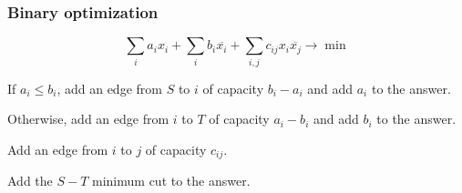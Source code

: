 \subsubsection{Binary optimization}
\[\sum_i a_i x_i + \sum_i b_i \overline{x_i} + \sum_{i, j} c_{i j} x_i \overline{x_j} \to \min\]

If $a_i \le b_i$,
add an edge from $S$ to $i$ of capacity $b_i - a_i$
and add $a_i$ to the answer.

Otherwise,
add an edge from $i$ to $T$ of capacity $a_i - b_i$
and add $b_i$ to the answer.

Add an edge from $i$ to $j$ of capacity $c_{i j}$.

Add the $S-T$ minimum cut to the answer.
